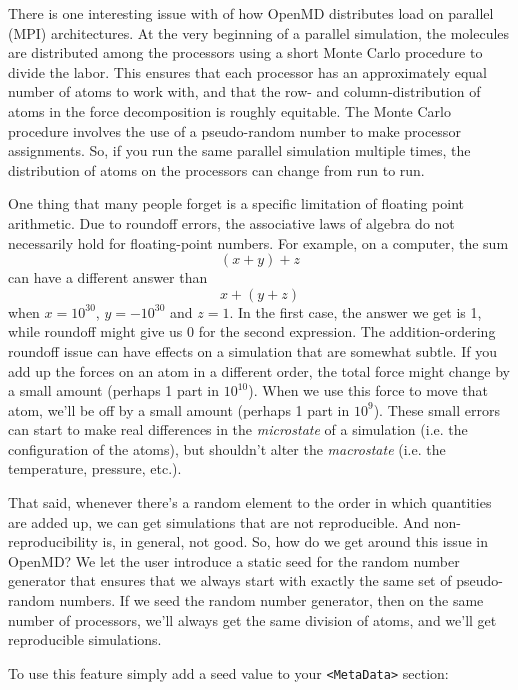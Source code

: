 \documentclass[]{book}
\begin{document}
There is one interesting issue with of how OpenMD distributes load on
parallel (MPI) architectures.  At the very beginning of a parallel
simulation, the molecules are distributed among the processors using a
short Monte Carlo procedure to divide the labor.  This ensures that
each processor has an approximately equal number of atoms to work
with, and that the row- and column-distribution of atoms in the force
decomposition is roughly equitable. The Monte Carlo procedure
involves the use of a pseudo-random number to make processor
assignments. So, if you run the same parallel simulation multiple
times, the distribution of atoms on the processors can change from run
to run.

One thing that many people forget is a specific limitation of floating
point arithmetic.  Due to roundoff errors, the associative laws of
algebra do not necessarily hold for floating-point numbers. For
example, on a computer, the sum
\begin{equation*}
(x+y)+z
\end{equation*}
can have a different answer than
\begin{equation*}
x+(y+z)
\end{equation*}
when $x = 10^{30}$, $y = -10^{30}$ and $z = 1$.  In the first case,
the answer we get is 1, while roundoff might give us 0 for the second
expression.  The addition-ordering roundoff issue can have effects on
a simulation that are somewhat subtle.  If you add up the forces on an
atom in a different order, the total force might change by a small
amount (perhaps 1 part in $10^{10}$). When we use this force to move that
atom, we’ll be off by a small amount (perhaps 1 part in $10^9$). These
small errors can start to make real differences in the {\it microstate} of a
simulation (i.e. the configuration of the atoms), but shouldn’t alter
the {\it macrostate} (i.e. the temperature, pressure, etc.).

That said, whenever there’s a random element to the order in which
quantities are added up, we can get simulations that are not
reproducible.  And non-reproducibility is, in general, not good.  So,
how do we get around this issue in OpenMD?  We let the user introduce
a static seed for the random number generator that ensures that we
always start with exactly the same set of pseudo-random numbers.  If
we seed the random number generator, then on the same number of
processors, we’ll always get the same division of atoms, and we’ll get
reproducible simulations.

To use this feature simply add a seed value to your {\tt <MetaData>} section:
\end{document}

